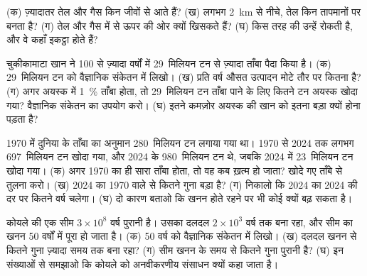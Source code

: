 \begin{exercise}[$\star\star$]\label{exo:g9:earth-resources:9}
(क) ज़्यादातर तेल और गैस किन जीवों से आते हैं? (ख) लगभग \qty{2}{km} से नीचे, तेल
किन तापमानों पर बनता है? (ग) तेल और गैस  में से ऊपर की ओर क्यों खिसकते हैं?
(घ) किस तरह की  उन्हें रोकती है, और वे कहाँ इकट्ठा होते
हैं?
\end{exercise}

\begin{exercise}[$\star\star$]\label{exo:g9:earth-resources:10}
चुकीकामाटा खान ने 100 से ज़्यादा वर्षों में 29~मिलियन टन से ज़्यादा ताँबा पैदा किया है।
(क) 29~मिलियन टन को वैज्ञानिक संकेतन में लिखो। (ख) प्रति वर्ष औसत उत्पादन मोटे तौर
पर कितना है? (ग) अगर अयस्क में \qty{1}{\%} ताँबा होता, तो 29~मिलियन टन ताँबा पाने के
लिए कितने टन अयस्क खोदा गया? वैज्ञानिक संकेतन का उपयोग करो। (घ) इतने कमज़ोर अयस्क की खान
को इतना बड़ा क्यों होना पड़ता
है?
\end{exercise}

\begin{exercise}[$\star\star\star$]\label{exo:g9:earth-resources:11}
1970 में दुनिया के ताँबा  का अनुमान 280~मिलियन टन लगाया गया था। 1970 से 2024
तक लगभग 697~मिलियन टन खोदा गया, और 2024 के  980~मिलियन टन थे, जबकि 2024 में
23~मिलियन टन खोदा गया। (क) अगर 1970 का  ही सारा ताँबा होता, तो वह कब ख़त्म हो
जाता? खोदे गए ताँबे से तुलना करो। (ख) 2024 का  1970 वाले से कितने गुना बड़ा है?
(ग) निकालो कि 2024 का  2024 की दर पर कितने वर्ष चलेगा। (घ) दो कारण बताओ कि
खनन होते रहने पर भी कोई  क्यों बढ़ सकता
है।
\end{exercise}

\begin{exercise}[$\star\star\star$]\label{exo:g9:earth-resources:12}
कोयले की एक सीम $3 \times 10^8$ वर्ष पुरानी है। उसका दलदल $2 \times 10^3$
वर्ष तक बना रहा, और सीम का खनन 50 वर्षों में पूरा हो जाता है। (क) 50 वर्ष को वैज्ञानिक
संकेतन में लिखो। (ख) दलदल खनन से कितने गुना ज़्यादा समय तक बना रहा? (ग) सीम खनन के
समय से कितने गुना पुरानी है? (घ) इन संख्याओं से समझाओ कि कोयले को अनवीकरणीय संसाधन
क्यों कहा जाता है।
\end{exercise}

